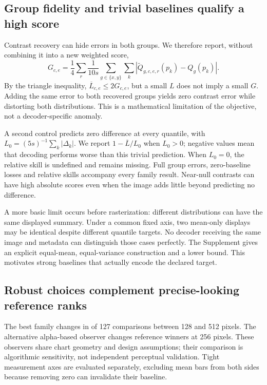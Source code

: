 \documentclass[11pt]{article}
\begin{document}
\clearpage
\subsection*{Group fidelity and trivial baselines qualify a high score}
Contrast recovery can hide errors in both groups. We therefore report, without combining it into a new weighted score,
\begin{equation}
G_{c,e}=\frac{1}{4}\sum_r\frac{1}{10s}\sum_{g\in\{x,y\}}\sum_k|\widetilde Q_{g,c,e,r}(p_k)-Q_g(p_k)|.
\end{equation}
By the triangle inequality, $\overline L_{c,e}\leq2G_{c,e}$, but a small $L$ does not imply a small $G$. Adding the same error to both recovered groups yields zero contrast error while distorting both distributions. This is a mathematical limitation of the objective, not a decoder-specific anomaly.

A second control predicts zero difference at every quantile, with $L_0=(5s)^{-1}\sum_k|\Delta_k|$. We report $1-\overline L/L_0$ when $L_0>0$; negative values mean that decoding performs worse than this trivial prediction. When $L_0=0$, the relative skill is undefined and remains missing. Full group errors, zero-baseline losses and relative skills accompany every family result. Near-null contrasts can have high absolute scores even when the image adds little beyond predicting no difference.

A more basic limit occurs before rasterization: different distributions can have the same displayed summary. Under a common fixed axis, two mean-only displays may be identical despite different quantile targets. No decoder receiving the same image and metadata can distinguish those cases perfectly. The Supplement gives an explicit equal-mean, equal-variance construction and a lower bound. This motivates strong baselines that actually encode the declared target.

\subsection*{Robust choices complement precise-looking reference ranks}
The best family changes in \ResolutionChanged{} of 127 comparisons between 128 and 512 pixels. The alternative alpha-based observer changes \ObserverChanged{} reference winners at 256 pixels. These observers share chart geometry and design assumptions; their comparison is algorithmic sensitivity, not independent perceptual validation. Tight measurement axes are evaluated separately, excluding mean bars from both sides because removing zero can invalidate their baseline.
\end{document}
